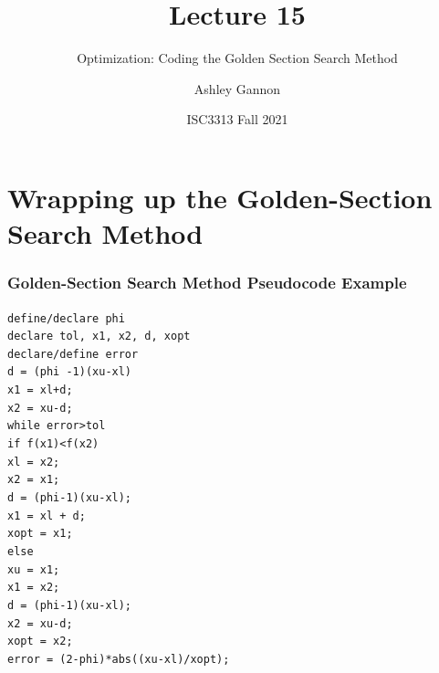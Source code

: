 \documentclass{if-beamer}
\title[Lecture 15]{Lecture 15}
\subtitle{Optimization: Coding the Golden Section Search Method}
\author{Ashley Gannon}
\date{ISC3313 Fall 2021}
\begin{document}
\begin{frame}
  \titlepage
\end{frame}
\section{Wrapping up the Golden-Section Search Method}

\begin{frame}
\frametitle{Golden-Section Search Method Pseudocode Example}

\texttt{define/declare phi}\\
\texttt{declare tol, x1, x2, d, xopt}\\
\texttt{declare/define error}\\\vspace{10pt}
\texttt{d = (phi -1)(xu-xl)}\\
\texttt{x1 = xl+d;}\\
\texttt{x2 = xu-d;}\\\vspace{10pt}
\texttt{while error>tol}\\
\texttt{\qquad if f(x1)<f(x2)}\\
\texttt{\qquad \qquad xl = x2;}\\
\texttt{\qquad \qquad x2 = x1;}\\
\texttt{\qquad \qquad d = (phi-1)(xu-xl);}\\
\texttt{\qquad \qquad x1 = xl + d;}\\
\texttt{\qquad \qquad xopt = x1;}\\
\texttt{\qquad else}\\
\texttt{\qquad \qquad xu = x1;}\\
\texttt{\qquad \qquad x1 = x2;}\\
\texttt{\qquad \qquad d = (phi-1)(xu-xl);}\\
\texttt{\qquad \qquad x2 = xu-d;}\\
\texttt{\qquad \qquad xopt = x2;}\\
\texttt{\qquad error = (2-phi)*abs((xu-xl)/xopt);} \\	

\end{frame}
\end{document}
